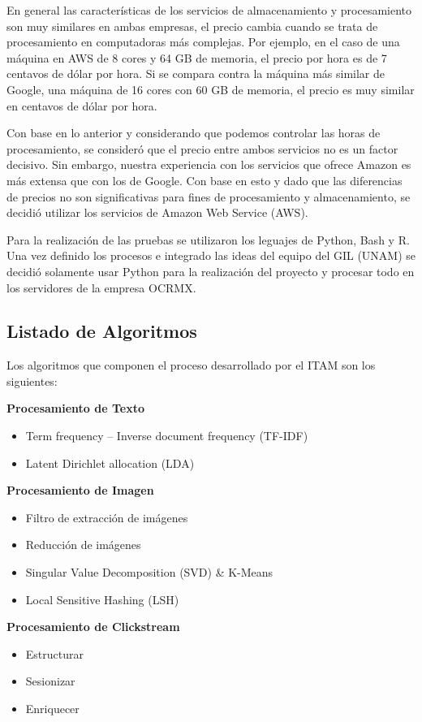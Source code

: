 En general las características de los servicios de almacenamiento y procesamiento son muy similares en ambas empresas, el precio cambia cuando se trata de procesamiento en computadoras más complejas. Por ejemplo, en el caso de una máquina en AWS de 8 cores y 64 GB de memoria, el precio por hora es de 7 centavos de dólar por hora. Si se compara contra la máquina más similar de Google, una máquina de 16 cores con 60 GB de memoria, el precio es muy similar en centavos de dólar por hora.

Con base en lo anterior y considerando que podemos controlar las horas de procesamiento, se consideró que el precio entre ambos servicios no es un factor decisivo. Sin embargo, nuestra experiencia con los servicios que ofrece Amazon es más extensa que con los de Google. Con base en esto y dado que las diferencias de precios no son significativas para fines de procesamiento y almacenamiento, se decidió utilizar los servicios de Amazon Web Service (AWS).

Para la realización de las pruebas se utilizaron los leguajes de  Python, Bash y R. Una vez definido los procesos  e integrado las ideas del equipo del GIL (UNAM) se decidió solamente usar Python para la realización del proyecto y procesar todo en los servidores de la empresa OCRMX.   

\subsection{Listado de Algoritmos}

Los algoritmos que componen el proceso desarrollado por el ITAM son los siguientes:



\textbf{Procesamiento de Texto}

\begin{itemize}
\itemsep1pt\parskip0pt
\item
  Term frequency – Inverse document frequency (TF-IDF)
\item
  Latent Dirichlet allocation (LDA)
\end{itemize}

\textbf{Procesamiento de Imagen}

\begin{itemize}
\itemsep1pt\parskip0pt
\item
  Filtro de extracción de imágenes
\item
  Reducción de imágenes
\item
  Singular Value Decomposition (SVD) \& K-Means
\item
  Local Sensitive Hashing (LSH)
\end{itemize}

\textbf{Procesamiento de Clickstream}
\begin{itemize}
\item Estructurar
\item Sesionizar
\item Enriquecer 
\end{itemize}